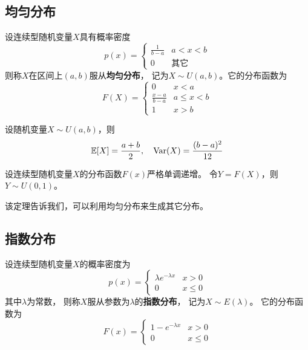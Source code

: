 \subsection{均匀分布}
\begin{definition}[均匀分布]
  设连续型随机变量$X$具有概率密度
  \begin{displaymath}
    p(x) = \begin{cases}
      \frac{1}{b-a} & a < x < b \\
      0 & \text{其它}
    \end{cases}
  \end{displaymath}
  则称$X$在区间上$(a,b)$服从\textbf{均匀分布}，
  记为$X\sim U(a,b)$。它的分布函数为
  \begin{displaymath}
    F(X) = \begin{cases}
      0 & x < a \\
      \frac{x-a}{b-a} & a \le x < b \\
      1 & x > b
    \end{cases}
  \end{displaymath}
\end{definition}

\begin{theorem}[均匀分布的数字特征]
  设随机变量$X\sim U(a,b)$，则
  \begin{displaymath}
    \mathbb{E}[X]=\frac{a+b}{2},\quad \textrm{Var}(X)=\frac{(b-a)^2}{12}
  \end{displaymath}
\end{theorem}

\begin{theorem}
  设连续型随机变量$X$的分布函数$F(x)$严格单调递增。
  令$Y=F(X)$，则$Y\sim U(0,1)$。
\end{theorem}

\begin{remark}
  该定理告诉我们，可以利用均匀分布来生成其它分布。
\end{remark}

\subsection{指数分布}
\begin{definition}[指数分布]
  设连续型随机变量$X$的概率密度为
  \begin{displaymath}
    p(x) = \begin{cases}
      \lambda e^{-\lambda x} & x > 0 \\
      0 & x \le 0
    \end{cases}
  \end{displaymath}
  其中$\lambda$为常数，
  则称$X$服从参数为$\lambda$的\textbf{指数分布}，
  记为$X\sim E(\lambda)$。
  它的分布函数为
  \begin{displaymath}
    F(x) = \begin{cases}
      1 - e^{-\lambda x} & x > 0 \\
      0 & x \le 0
    \end{cases}
  \end{displaymath}
\end{definition}

